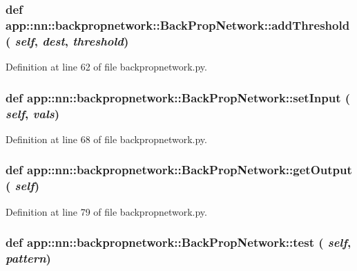 \subsubsection{\setlength{\rightskip}{0pt plus 5cm}def app::nn::backpropnetwork::BackPropNetwork::addThreshold ( {\em self},  {\em dest},  {\em threshold})}\label{classapp_1_1nn_1_1backpropnetwork_1_1BackPropNetwork_f105d7b8e42ead35b9abdfa50b4d83e9}




Definition at line 62 of file backpropnetwork.py.
\subsubsection{\setlength{\rightskip}{0pt plus 5cm}def app::nn::backpropnetwork::BackPropNetwork::setInput ( {\em self},  {\em vals})}\label{classapp_1_1nn_1_1backpropnetwork_1_1BackPropNetwork_64019fd6a370ab3e99abcf640210b0f3}




Definition at line 68 of file backpropnetwork.py.
\subsubsection{\setlength{\rightskip}{0pt plus 5cm}def app::nn::backpropnetwork::BackPropNetwork::getOutput ( {\em self})}\label{classapp_1_1nn_1_1backpropnetwork_1_1BackPropNetwork_da2b98bbdeac978ec845eb10b7c00825}




Definition at line 79 of file backpropnetwork.py.
\subsubsection{\setlength{\rightskip}{0pt plus 5cm}def app::nn::backpropnetwork::BackPropNetwork::test ( {\em self},  {\em pattern})}\label{classapp_1_1nn_1_1backpropnetwork_1_1BackPropNetwork_5a073915594bdf65b20c44d2d8896856}




